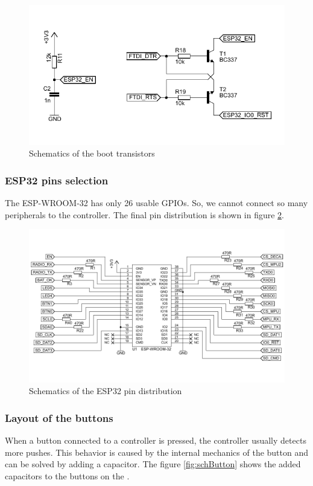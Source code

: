 \begin{figure}
    \centering
    \caption{Schematics of the boot transistors}
    \label{fig:schBoot}
    \includegraphics[scale=1.3]{img/SchBoot.pdf}
\end{figure}

\subsubsection{ESP32 pins selection}
The ESP-WROOM-32 \cite{espressif:ESP-WROOM-32} has only 26 usable \ac{GPIO}s. So, we cannot connect so many peripherals to the  controller. The final pin distribution is shown in figure \ref{fig:schPinout}.

\begin{figure}
    \centering
    \caption{Schematics of the ESP32 pin distribution}
    \label{fig:schPinout}
    \includegraphics[scale=1.3, angle=90]{img/SchPinout.pdf}
\end{figure}

\subsubsection{Layout of the buttons}
When a button connected to a controller is pressed, the controller usually detects more pushes. This behavior is caused by the internal mechanics of the button and can be solved by adding a capacitor. The figure \ref{fig:schButton} shows the added capacitors to the buttons on the .

